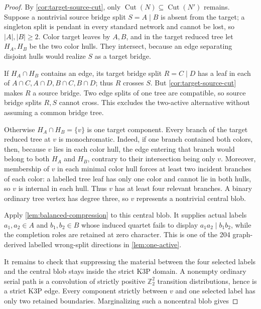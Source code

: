 \begin{proof}
By \cref{cor:target-source-cut}, only
\(\operatorname{Cut}(N)\subseteq\operatorname{Cut}(N')\) remains.  Suppose a
nontrivial source bridge split \(S=A\mid B\) is absent from the target; a
singleton split is pendant in every standard network and cannot be lost, so
\(|A|,|B|\ge2\).
Color target leaves by \(A,B\), and in the target reduced tree let \(H_A,H_B\)
be the two color hulls.  They intersect, because an edge separating disjoint
hulls would realize \(S\) as a target bridge.

If \(H_A\cap H_B\) contains an edge, its target bridge split \(R=C\mid D\)
has a leaf in each of
\(A\cap C,A\cap D,B\cap C,B\cap D\); thus \(R\) crosses \(S\).  But
\cref{cor:target-source-cut} makes \(R\) a source bridge.  Two edge splits of
one tree are compatible, so source bridge splits \(R,S\) cannot cross.  This
excludes the two-active alternative without assuming a common bridge tree.

Otherwise \(H_A\cap H_B=\{v\}\) is one target component.  Every branch of
the target reduced tree at \(v\) is monochromatic.  Indeed, if one branch
contained both colors, then, because \(v\) lies in each color hull, the edge
entering that branch would belong to both \(H_A\) and \(H_B\), contrary to
their intersection being only \(v\).  Moreover, membership of \(v\) in each
minimal color hull forces at least two incident branches of each color: a
labelled tree leaf has only one color and cannot lie in both hulls, so \(v\)
is internal in each hull.
Thus \(v\) has at least four relevant branches.  A binary ordinary tree
vertex has degree three, so \(v\) represents a nontrivial central blob.

Apply \cref{lem:balanced-compression} to this central blob.  It supplies
actual labels \(a_1,a_2\in A\) and \(b_1,b_2\in B\) whose induced quartet
fails to display \(a_1a_2\mid b_1b_2\), while the completion roles are
retained at zero character.  This is one of the 204 graph-derived labelled
wrong-split directions in \cref{lem:one-active}.

It remains to check that suppressing the material between the four selected
labels and the central blob stays inside the strict K3P domain.  A nonempty
ordinary serial path is a convolution of strictly positive
\(\mathbb Z_2^2\) transition distributions, hence is a strict K3P edge.
Every component strictly between \(v\) and one selected label has only two
retained boundaries.  Marginalizing such a noncentral blob gives


\end{proof}
